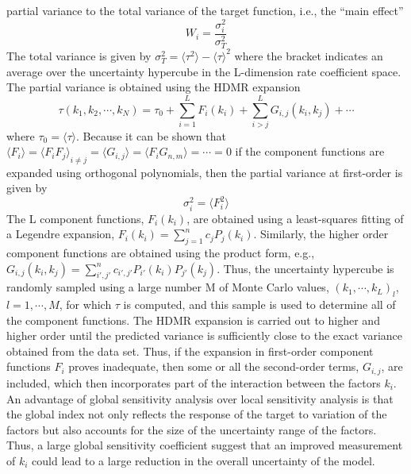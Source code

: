 partial variance to the total variance of the target function, i.e.,
the “main effect”
\begin{equation}
\label{ch3:eqn14}
W_i = \frac{\sigma_i^{2}}{\sigma_T^2}
\end{equation}
The total variance is given by $\sigma_T^2=\langle {\tau}^2 \rangle - {\langle \tau \rangle}^2$ where the
bracket indicates an average over the uncertainty hypercube in
the L-dimension rate coefficient space. The partial variance is
obtained using the HDMR expansion
\begin{equation}
\label{ch3:eqn15:HDMR}
\tau(k_1, k_2,\cdots,k_N) = \tau_0 + \sum_{i=1}^{L}{F_i(k_i)} + \sum_{i>j}^{L} {G_{i,j}(k_i, k_j)} + \cdots
\end{equation}
where $\tau_0 = \langle \tau \rangle$. Because it can be shown that $\langle F_i \rangle = {\langle F_iF_j \rangle}_{i \neq j} = \langle G_{i,j} \rangle = \langle F_iG_{n,m}  \rangle = \cdots = 0$ if the component functions are
expanded using orthogonal polynomials, then the partial
variance at first-order is given by
\begin{equation}
\label{ch3:eqn16:sigmaF}
\sigma_i^2 = \langle F_i^2 \rangle
\end{equation}
The L component functions, $F_i(k_i)$, are obtained using a
least-squares fitting of a Legendre expansion, $F_i(k_i) = \sum_{j=1}^{n}{c_jP_j(k_i)}$. Similarly, the higher order component functions
are obtained using the product form, e.g., $G_{i,j}(k_i,k_j) = \sum_{i\prime,j\prime}^{n}{c_{i\prime,j\prime}P_{i\prime}(k_i)P_{j\prime}(k_j)}$. Thus, the uncertainty hypercube is
randomly sampled using a large number M of Monte Carlo
values, ${(k_1, \cdots, k_L)}_l$, $l = 1, \cdots, M$, for which $\tau$ is computed, and this
sample is used to determine all of the component functions.
The HDMR expansion is carried out to higher and higher order
until the predicted variance is sufficiently close to the exact
variance obtained from the data set. Thus, if the expansion in
first-order component functions $F_i$ proves inadequate, then
some or all the second-order terms, $G_{i,j}$, are included, which
then incorporates part of the interaction between the factors $k_i$.
An advantage of global sensitivity analysis over local sensitivity
analysis is that the global index not only reflects the response of
the target to variation of the factors but also accounts for the
size of the uncertainty range of the factors. Thus, a large global
sensitivity coefficient suggest that an improved measurement of
$k_i$ could lead to a large reduction in the overall uncertainty of
the model.
\newline
